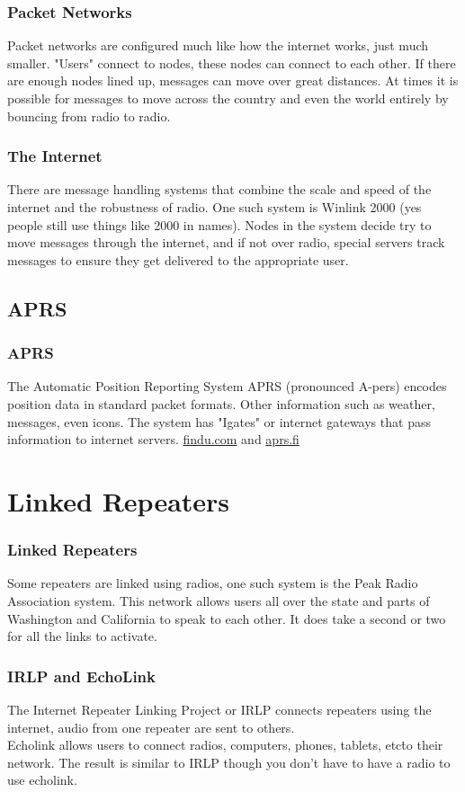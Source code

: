 \documentclass[10pt]{beamer}
\begin{document}
\begin{frame}
\frametitle{Packet Networks}
Packet networks are configured much like how the internet works, just much smaller. "Users" connect to nodes, these nodes can connect to each other. If there are enough nodes lined up, messages can move over great distances. At times it is possible for messages to move across the country and even the world entirely by bouncing from radio to radio.
\end{frame}

\begin{frame}
\frametitle{The Internet}
There are message handling systems that combine the scale and speed of the internet and the robustness of radio. One such system is Winlink 2000 (yes people still use things like 2000 in names). Nodes in the system decide try to move messages through the internet, and if not over radio, special servers track messages to ensure they get delivered to the appropriate user.
\end{frame}

\subsection{APRS}
\begin{frame}
\frametitle{APRS}
The Automatic Position Reporting System APRS (pronounced A-pers) encodes position data in standard packet formats. Other information such as weather, messages, even icons. The system has "Igates" or internet gateways that pass information to internet servers. \hyperlink{www.findu.com}{findu.com} and \hyperlink{www.aprs.fi}{aprs.fi}
\end{frame}

\section{Linked Repeaters}

\begin{frame}
\frametitle{Linked Repeaters}
Some repeaters are linked using radios, one such system is the Peak Radio Association system. This network allows users all over the state and parts of Washington and California to speak to each other. It does take a second or two for all the links to activate.
\end{frame}

\begin{frame}
\frametitle{IRLP and EchoLink}
The Internet Repeater Linking Project or IRLP connects repeaters using the internet, audio from one repeater are sent to others.\\
Echolink allows users to connect radios, computers, phones, tablets, etc\. to their network. The result is similar to IRLP though you don't have to have a radio to use echolink. 
\end{frame}
\end{document}
